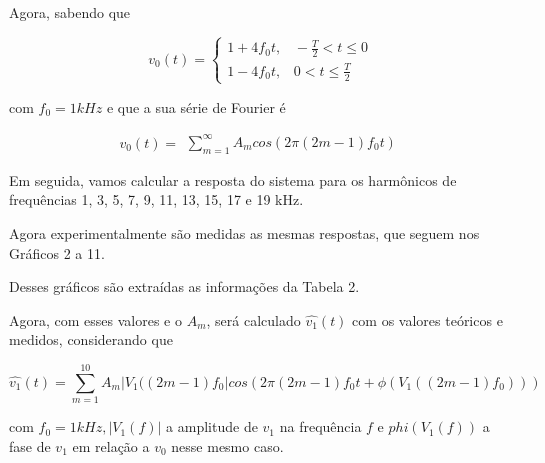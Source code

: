 
Agora, sabendo que 

\begin{equation*}
v_0(t)=\left\{
\begin{array}{lr}
1+4f_0t,\hspace{10pt} -\frac{T}{2}<t\leq0\\
1-4f_0t,\hspace{10pt} 0<t\leq\frac{T}{2}
\end{array}\right.
\end{equation*}

com $f_0=1kHz$ e que a sua série de Fourier é

\begin{equation*}
v_0(t)=
\begin{array}{lr}
\sum\limits_{m=1}^\infty A_m cos (2\pi(2m-1)f_0t)
\end{array}
\end{equation*}


Em seguida, vamos calcular a resposta do sistema para os harmônicos de frequências 1, 3, 5, 7, 9, 11, 13, 15, 17 e 19 kHz.


Agora experimentalmente são medidas as mesmas respostas, que seguem nos Gráficos 2 a 11. 



Desses gráficos são extraídas as informações da Tabela 2.
\newpage



Agora, com esses valores e o $A_m$, será calculado $\hat{v_1}(t)$ com os valores teóricos e medidos, considerando que 

\[\hat{v_1}(t)=\sum\limits_{m=1}^{10}A_m|V_1((2m-1)f_0|cos(2\pi(2m-1)f_0t+\phi(V_1((2m-1)f_0)))\]

com $f_0=1kHz, |V_1(f)|$ a amplitude de $v_1$ na frequência $f$ e $phi(V_1(f))$ a fase de $v_1$ em relação a $v_0$ nesse mesmo caso.

